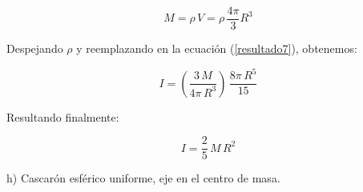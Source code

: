 \documentclass[letter,11pt]{article}
\begin{document}
\begin{equation*}
    M = \rho\, V = \rho\, \frac{4\pi}{3} R^3
\end{equation*}

Despejando $\rho$ y reemplazando en la ecuación (\ref{resultado7}), obtenemos:

\begin{equation*}
    I = (\frac{3\, M}{4\pi\, R^3})\, \frac{8\pi\, R^5}{15}
\end{equation*}

Resultando finalmente:

\begin{equation}
    I = \frac{2}{5}\, M\, R^2
\end{equation}

\newpage
h) Cascarón esférico uniforme, eje en el centro de masa.
\end{document}
